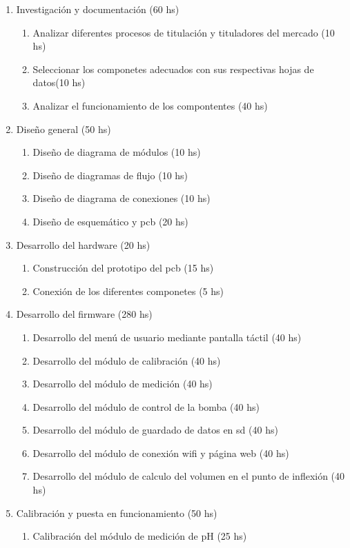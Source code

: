 \documentclass[11pt]{charter}
\begin{document}
\begin{enumerate}
\item Investigación y documentación (60 hs)
	\begin{enumerate}
	\item Analizar diferentes procesos de titulación y tituladores del mercado (10 hs)
	\item Seleccionar los componetes adecuados con sus respectivas hojas de datos(10 hs)
	\item Analizar el funcionamiento de los compontentes (40 hs)
	\end{enumerate}
\item Diseño general (50 hs)
	\begin{enumerate}
	\item Diseño de diagrama de módulos (10 hs)
	\item Diseño de diagramas de flujo (10 hs)
	\item Diseño de diagrama de conexiones (10 hs)
	\item Diseño de esquemático y pcb (20 hs)
	\end{enumerate}
\item Desarrollo del hardware (20 hs)
	\begin{enumerate}
	\item Construcción del prototipo del pcb (15 hs)
	\item Conexión de los diferentes componetes (5 hs)
	\end{enumerate}
\item Desarrollo del firmware (280 hs)	
	\begin{enumerate}
	\item Desarrollo del menú de usuario mediante pantalla táctil (40 hs)
	\item Desarrollo del módulo de calibración (40 hs)
	\item Desarrollo del módulo de medición (40 hs)
	\item Desarrollo del módulo de control de la bomba (40 hs)
	\item Desarrollo del módulo de guardado de datos en sd (40 hs)
	\item Desarrollo del módulo de conexión wifi y página web (40 hs)
	\item Desarrollo del módulo de calculo del volumen en el punto de inflexión (40 hs)
	\end{enumerate}
\item Calibración y puesta en funcionamiento (50 hs)
	\begin{enumerate}	
	\item Calibración del módulo de medición de pH (25 hs)

\end{enumerate}
\end{enumerate}
\end{document}
